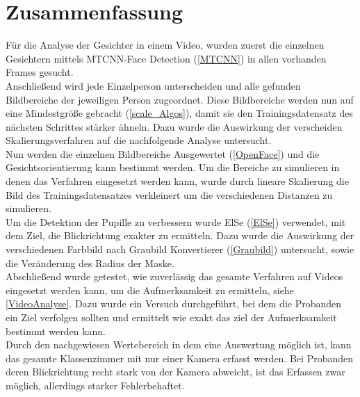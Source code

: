 \section{Zusammenfassung}
Für die Analyse der Gesichter in einem Video, wurden zuerst die einzelnen Gesichtern mittels MTCNN-Face Detection (\autoref{MTCNN}) in allen vorhanden Frames gesucht.\\
Anschließend wird jede Einzelperson unterscheiden und alle gefunden Bildbereiche der jeweiligen Person zugeordnet. Diese Bildbereiche werden nun auf eine Mindestgröße gebracht (\autoref{scale_Algos}), damit sie den Trainingsdatensatz des nächsten Schrittes stärker ähneln. Dazu wurde die Auswirkung der verscheiden Skalierungsverfahren auf die nachfolgende Analyse untersucht.\\
Nun werden die einzelnen Bildbereiche Ausgewertet (\autoref{OpenFace}) und die Gesichtsorientierung kann bestimmt werden. Um die Bereiche zu simulieren in denen das Verfahren eingesetzt werden kann, wurde durch lineare Skalierung die Bild des Trainingsdatensatzes verkleinert um die verschiedenen Distanzen zu simulieren.\\
Um die Detektion der Pupille zu verbessern wurde ElSe (\autoref{ElSe}) verwendet, mit dem Ziel, die Blickrichtung exakter zu ermitteln. Dazu wurde die Auswirkung der verschiedenen Farbbild nach Graubild Konvertierer (\autoref{Graubild}) untersucht, sowie die Veränderung des Radius der Maske.\\
Abschließend wurde getestet, wie zuverlässig das gesamte Verfahren auf Videos eingesetzt werden kann, um die Aufmerksamkeit zu ermitteln, siehe \autoref{VideoAnalyse}. Dazu wurde ein Versuch durchgeführt, bei dem die Probanden ein Ziel verfolgen sollten und ermittelt wie exakt das ziel der Aufmerksamkeit bestimmt werden kann.\\
Durch den nachgewiesen Wertebereich in dem eine Auswertung möglich ist, kann das gesamte Klassenzimmer mit nur einer Kamera erfasst werden. Bei Probanden deren Blickrichtung recht stark von der Kamera abweicht, ist das Erfassen zwar möglich, allerdings starker Fehlerbehaftet.
